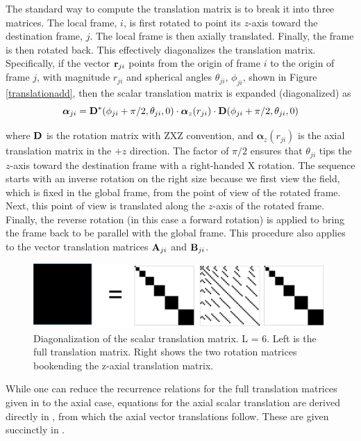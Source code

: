 The standard way to compute the translation matrix is to break it into three matrices. The local frame, $i$, is first rotated to point its $z$-axis toward the destination frame, $j$. The local frame is then axially translated. Finally, the frame is then rotated back. This effectively diagonalizes the translation matrix. Specifically, if the vector $\mathbf{r}_{ji}$ points from the origin of frame $i$ to the origin of frame $j$, with magnitude $r_{ji}$ and spherical angles $\theta_{ji}$, $\phi_{ji}$, shown in Figure \ref{translationadd}, then the scalar translation matrix is expanded (diagonalized) as
\begin{equation}
\boldsymbol{\alpha}_{ji} = \mathbf{D}^*(\phi_{ji}+\pi/2,\theta_{ji},0) \cdot \boldsymbol{\alpha}_z(r_{ji}) \cdot \mathbf{D}(\phi_{ji}+\pi/2,\theta_{ji},0)
\label{alphazdiag}
\end{equation}

\noindent where $\mathbf{D}$ is the rotation matrix with ZXZ convention, and $\boldsymbol{\alpha}_z(r_{ji})$ is the axial translation matrix in the $+z$ direction. The factor of $\pi/2$ ensures that $\theta_{ji}$ tips the $z$-axis toward the destination frame with a right-handed X rotation. The sequence starts with an inverse rotation on the right size because we first view the field, which is fixed in the global frame, from the point of view of the rotated frame. Next, this point of view is translated along the $z$-axis of the rotated frame. Finally, the reverse rotation (in this case a forward rotation) is applied to bring the frame back to be parallel with the global frame. This procedure also applies to the vector translation matrices $\mathbf{A}_{ji}$ and $\mathbf{B}_{ji}$.  

\begin{figure}[H] 
   \centering
   \includegraphics[width=5in]{Translation/Figures/alphaz} 
   \caption{Diagonalization of the scalar translation matrix.  L = 6.  Left is the full translation matrix.  Right shows the two rotation matrices bookending the z-axial translation matrix.}
   \label{figdiag}
\end{figure}


While one can reduce the recurrence relations for the full translation matrices given in \cite{chew1992recurrence, chew1993efficient} to the axial case, equations for the axial scalar translation are derived directly in \cite{mackowski1991analysis}, from which the axial vector translations follow. These are given succinctly in \cite{duan2015experimental}.  

